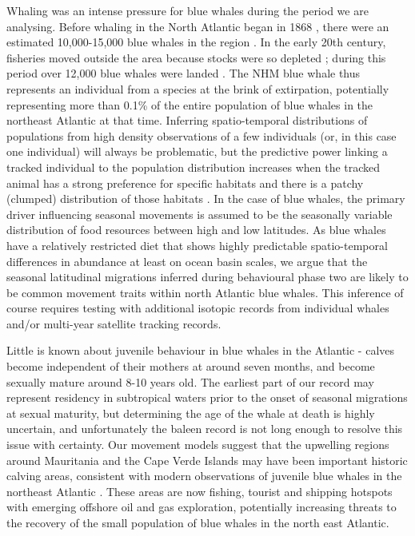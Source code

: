 \documentclass[a4paper,12pt]{article}
\begin{document}
Whaling was an intense pressure for blue whales during the period we are analysing. 
Before whaling in the North Atlantic began in 1868 \cite{reilly2008balaenoptera}, there were an estimated 10,000-15,000 blue whales in the region \cite{sigurjonsson1995life}. 
In the early 20th century, fisheries moved outside the area because stocks were so depleted \cite{reilly2008balaenoptera}; during this period over 12,000 blue whales were landed \cite{sigurjonsson1995life}. 
The NHM blue whale thus represents an individual from a species at the brink of extirpation, potentially representing  more than 0.1\% of the entire population of blue whales in the northeast Atlantic at that time.
Inferring spatio-temporal distributions of populations from high density observations of a few individuals (or, in this case one individual) will always be problematic, but the predictive power linking a tracked individual to the population distribution increases when the tracked animal has a strong preference for specific habitats and there is a patchy (clumped) distribution of those habitats \cite{holdo2013inferring}. 
In the case of blue whales, the primary driver influencing seasonal movements is assumed to be the seasonally variable distribution of food resources between high and low latitudes. 
As blue whales have a relatively restricted diet that shows highly predictable spatio-temporal differences in abundance at least on ocean basin scales, we argue that the seasonal latitudinal migrations inferred during behavioural phase two are likely to be common movement traits within north Atlantic blue whales. 
This inference of course requires testing with additional isotopic records from individual whales and/or multi-year satellite tracking records.

Little is known about juvenile behaviour in blue whales in the Atlantic - calves become independent of their mothers at around seven months, and become sexually mature around 8-10 years old. 
The earliest part of our record may represent residency in subtropical waters prior to the onset of seasonal migrations at sexual maturity, but determining the age of the whale at death is highly uncertain, and unfortunately the baleen record is not long enough to resolve this issue with certainty. 
Our movement models suggest that the upwelling regions around Mauritania and the Cape Verde Islands may have been important historic calving areas, consistent with modern observations of juvenile blue whales in the northeast Atlantic \cite{handbook}. 
These areas are now fishing, tourist and shipping hotspots with emerging offshore oil and gas exploration, potentially increasing threats to the recovery of the small population of blue whales in the north east Atlantic. 
\end{document}
